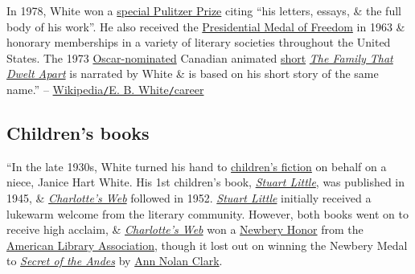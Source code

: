 \documentclass[oneside]{book}
\numberwithin{equation}{section}
\begin{document}
In 1978, White won a \href{https://en.wikipedia.org/wiki/Pulitzer_Prize_Special_Citations_and_Awards}{special Pulitzer Prize} citing ``his letters, essays, \& the full body of his work''. He also received the \href{https://en.wikipedia.org/wiki/Presidential_Medal_of_Freedom}{Presidential Medal of Freedom} in 1963 \& honorary memberships in a variety of literary societies throughout the United States. The 1973 \href{https://en.wikipedia.org/wiki/Academy_Award_for_Best_Animated_Short_Film}{Oscar-nominated} Canadian animated \href{https://en.wikipedia.org/wiki/Short_film}{short} \href{https://en.wikipedia.org/wiki/The_Family_That_Dwelt_Apart}{\textit{The Family That Dwelt Apart}} is narrated by White \& is based on his short story of the same name.'' -- \href{https://en.wikipedia.org/wiki/E.\_B.\_White\#Career}{Wikipedia\texttt{/}E. B. White\texttt{/}career}

\subsection{Children's books}
``In the late 1930s, White turned his hand to \href{https://en.wikipedia.org/wiki/Children%27s_literature}{children's fiction} on behalf on a niece, Janice Hart White. His 1st children's book, \href{https://en.wikipedia.org/wiki/Stuart_Little}{\textit{Stuart Little}}, was published in 1945, \& \href{https://en.wikipedia.org/wiki/Charlotte%27s_Web}{\textit{Charlotte's Web}} followed in 1952. \href{https://en.wikipedia.org/wiki/Stuart_Little}{\textit{Stuart Little}} initially received a lukewarm welcome from the literary community. However, both books went on to receive high acclaim, \& \href{https://en.wikipedia.org/wiki/Charlotte%27s_Web}{\textit{Charlotte's Web}} won a \href{https://en.wikipedia.org/wiki/Newbery_Medal}{Newbery Honor} from the \href{https://en.wikipedia.org/wiki/American_Library_Association}{American Library Association}, though it lost out on winning the Newbery Medal to \href{https://en.wikipedia.org/wiki/Secret_of_the_Andes}{\textit{Secret of the Andes}} by \href{https://en.wikipedia.org/wiki/Ann_Nolan_Clark}{Ann Nolan Clark}.
\end{document}
